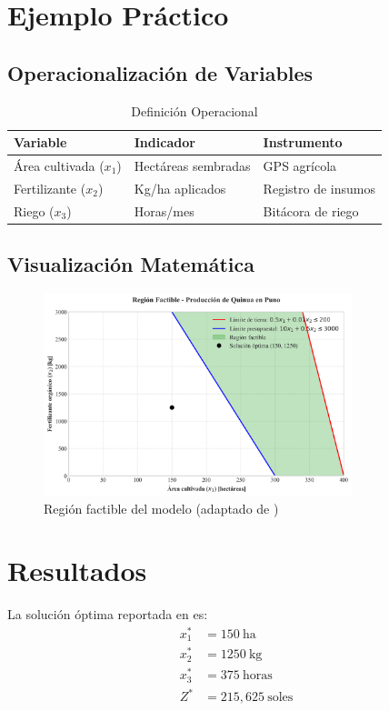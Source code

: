 \documentclass{article}
\begin{document}
\section{Ejemplo Práctico}
\subsection{Operacionalización de Variables}
\begin{table}[H]
\centering
\caption{Definición Operacional}
\begin{tabular}{lll}
\toprule
\textbf{Variable} & \textbf{Indicador} & \textbf{Instrumento} \\
\midrule
Área cultivada ($x_1$) & Hectáreas sembradas & GPS agrícola \\
Fertilizante ($x_2$) & Kg/ha aplicados & Registro de insumos \\
Riego ($x_3$) & Horas/mes & Bitácora de riego \\
\bottomrule
\end{tabular}
\end{table}

\subsection{Visualización Matemática}
\begin{figure}[H]
\centering
\includegraphics[width=0.8\textwidth]{region_factible_quinua.png}
\caption{Región factible del modelo (adaptado de \cite{condori2024})}
\label{fig:region}
\end{figure}

\section{Resultados}
La solución óptima reportada en \cite{condori2024} es:
\begin{align*}
x_1^* &= 150\ \text{ha} \\
x_2^* &= 1250\ \text{kg} \\
x_3^* &= 375\ \text{horas} \\
Z^* &= 215,\!625\ \text{soles}
\end{align*}



\end{document}
